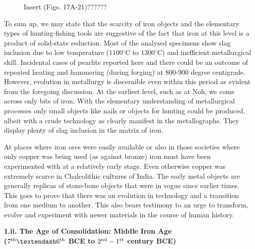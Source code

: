 \begin{figure}[H]
Insert (Figs. 17A-21)??????
\end{figure}
To sum up, we may state that the scarcity of iron objects and the elementary types of hunting-fishing tools are suggestive of the fact that iron at this level is a product of solid-state reduction. Most of the analysed specimens show slag inclusion due to low temperature ($1100^{\circ}$C to $1300^{\circ}$C) and inefficient metallurgical skill. Incidental cases of pearlite reported here and there could be an outcome of repeated heating and hammering (during forging) at 800-900 degree centigrade. However, evolution in metallurgy is discernible even within this period as evident from the foregoing discussion. At the earliest level, such as at Noh, we come across only bits of iron. With the elementary understanding of metallurgical processes only small objects like nails or objects for hunting could be produced, albeit with a crude technology as clearly manifest in the metallographs. They display plenty of slag inclusion in the matrix of iron.

At places where iron ores were easily available or also in those societies where only copper was being used (as against bronze) iron must have been experimented with at a relatively early stage. Even otherwise copper was extremely scarce in Chalcolithic cultures of India. The early metal objects are generally replicas of stone-bone objects that were in vogue since earlier times. This goes to prove that there was an evolution in technology and a transition from one medium to another. This also bears testimony to an urge to transform, evolve and experiment with newer materials in the course of human history.


\textbf{1.ii. The Age of Consolidation: Middle Iron Age\\ ($7^{\rm th} – 6^{\rm th}$ BCE to $2^{\rm nd} -1^{\rm st}$ century BCE)}

